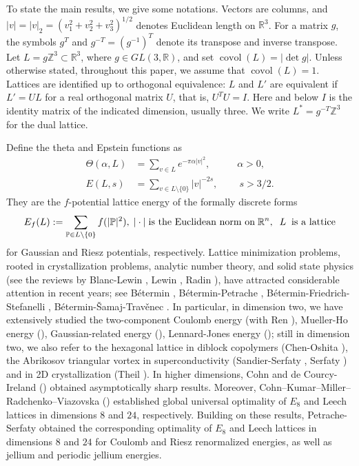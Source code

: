 \documentclass[reqno,english]{amsart}
\theoremstyle{definition}
\newtheorem{open problem}[theorem]{Open Problem}
\theoremstyle{remark}
\theoremstyle{plain}
\newcommand{\R}{{\mathbb R}}
\numberwithin{equation}{section}
\newcommand{\Z}{\mathbb Z}
\newcommand{\covol}{\operatorname{covol}}
\newcommand{\Th}{\Theta}
\begin{document}
To state the main results, we give some notations. Vectors are columns, and $|v|=|v|_2=(v_1^2+v_2^2+v_3^2)^{1/2}$
denotes Euclidean length on $\R^3$. For a matrix $g$, the symbols
$g^T$ and $g^{-T}=(g^{-1})^T$ denote its transpose and inverse transpose.
Let $L=g\Z^3\subset\R^3$, where $g\in GL(3,\R)$, and set
$\covol(L)=|\det g|$. Unless otherwise stated, throughout this paper, we assume that $\covol(L)=1$.
Lattices are identified up to orthogonal equivalence: $L$ and $L'$ are
equivalent if $L'=UL$ for a real orthogonal matrix $U$, that is,
$U^TU=I$. Here and below $I$ is the identity matrix of the indicated
dimension, usually three. We write $L^*=g^{-T}\Z^3$ for the dual lattice.

Define the theta and Epstein functions as
\begin{align}
 \Th(\alpha,L)&=\sum_{v\in L}e^{-\pi\alpha|v|^2},\;\;\;\;\;\;\;\;\;\;
       \alpha>0,\label{T:eq:theta}\\
 E(L,s)&=\sum_{v\in L\setminus\{0\}}|v|^{-2s},
       \;\;\;\;\;\;\;\;s>3/2.\label{E:eq:Epstein}
\end{align}
They are the $f$-potential lattice energy of the formally discrete forms
 \begin{equation}\aligned\label{EFL}
E_f(L):=\sum_{\mathbb{P}\in L \backslash\{0\}} f(|\mathbb{P}|^2),\; |\cdot|\;\hbox{is the Euclidean norm on}\;\mathbb{R}^n,
\;\;L\;\;\hbox{is a lattice}
\endaligned\end{equation}
for Gaussian and Riesz potentials, respectively.
Lattice minimization problems, rooted in crystallization problems, analytic number theory, and solid state physics (see the reviews by Blanc-Lewin \cite{Bla2015}, Lewin \cite{Lewin2022,Lewin2025}, Radin \cite{Radin1987,Radin1991}), have attracted considerable attention in recent years;
see B\'etermin \cite{Bet2016,Betermin2021AHP,Betermin2021JPA,Betermin2021SIAM}, B\'{e}termin-Petrache \cite{Betermin2017,Betermin2019b}, B\'{e}termin-Friedrich-Stefanelli \cite{Betermin2021LMP}, B\'etermin-\v{S}amaj-Trav\v{e}nec \cite{Betermin2023SAM,Betermin2024AMP}.
In particular, in dimension two, we have extensively studied the two-component Coulomb energy (with Ren \cite{Luo2019}), Mueller-Ho energy (\cite{Luo2022}), Gaussian-related energy (\cite{LW2022,Luo2023,LW2025b,LW2026}), Lennard-Jones energy (\cite{LW2025}); still in dimension two, we also refer to the hexagonal lattice in diblock copolymers (Chen-Oshita \cite{Che2007}), the Abrikosov triangular vortex in superconductivity (Sandier-Serfaty \cite{Serfaty2010,Serfaty2012}, Serfaty \cite{Serfaty2018}) and in 2D crystallization (Theil \cite{Theil2006}).
In higher dimensions, Cohn and de Courcy-Ireland (\cite{Cohn2018}) obtained asymptotically sharp results. Moreover, Cohn--Kumar--Miller--Radchenko--Viazovska (\cite{Cohn2022}) established global universal optimality of $E_8$ and Leech lattices in dimensions $8$ and $24$, respectively. Building on these results, Petrache-Serfaty \cite{Petr2020} obtained the corresponding optimality of $E_8$ and Leech lattices in dimensions $8$ and $24$ for Coulomb and Riesz renormalized energies, as well as jellium and periodic jellium energies.
\end{document}
